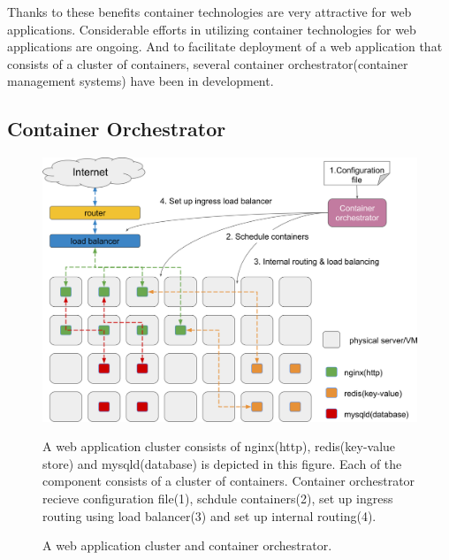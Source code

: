 Thanks to these benefits container technologies are very attractive for web applications.
Considerable efforts in utilizing container technologies for web applications are ongoing.
And to facilitate deployment of a web application that consists of a cluster of containers, several container orchestrator(container management systems) have been in development.

\subsection{Container Orchestrator}

\begin{figure}[h]
\begin{center}
\includegraphics[width=0.9\columnwidth]{Figs/container_management_system}
\end{center}
\caption{
A web application cluster and container orchestrator.
}
\centering\parbox[c]{0.9\columnwidth}{
A web application cluster consists of nginx(http), redis(key-value store) and mysqld(database) is depicted in this figure. 
Each of the component consists of a cluster of containers.
Container orchestrator recieve configuration file(1), schdule containers(2), set up ingress routing using load balancer(3) and set up internal routing(4).
}
\label{fig:container_management_system}
\end{figure}

